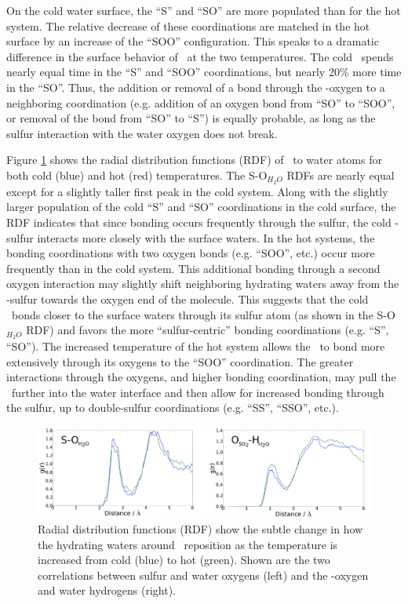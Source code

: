 \documentclass{article}
\begin{document}
On the cold water surface, the ``S'' and ``SO'' are more populated than for the hot system. The relative decrease of these coordinations are matched in the hot surface by an increase of the ``SOO'' configuration. This speaks to a dramatic difference in the surface behavior of \suldiox~at the two temperatures. The cold \suldiox~spends nearly equal time in the ``S'' and ``SOO'' coordinations, but nearly 20\% more time in the ``SO''. Thus, the addition or removal of a bond through the \suldiox-oxygen to a neighboring coordination (e.g. addition of an oxygen bond from ``SO'' to ``SOO'', or removal of the bond from ``SO'' to ``S'') is equally probable, as long as the sulfur interaction with the water oxygen does not break. 

Figure \ref{fig:rdf} shows the radial distribution functions (RDF) of \suldiox~to water atoms for both cold (blue) and hot (red) temperatures. The S-O$_{H_2O}$ RDFs are nearly equal except for a slightly taller first peak in the cold system. Along with the slightly larger population of the cold ``S'' and ``SO'' coordinations in the cold surface, the RDF indicates that since bonding occurs frequently through the sulfur, the cold \suldiox-sulfur interacts more closely with the surface waters. In the hot systems, the bonding coordinations with two oxygen bonds (e.g. ``SOO'', etc.) occur more frequently than in the cold system. This additional bonding through a second oxygen interaction may slightly shift neighboring hydrating waters away from the \suldiox-sulfur towards the oxygen end of the molecule. This suggests that the cold \suldiox~bonds closer to the surface waters through its sulfur atom (as shown in the S-O$_{H_2O}$ RDF) and favors the more ``sulfur-centric'' bonding coordinations (e.g. ``S'', ``SO''). The increased temperature of the hot system allows the \suldiox~to bond more extensively through its oxygens to the ``SOO'' coordination. The greater interactions through the oxygens, and higher bonding coordination, may pull the \suldiox~further into the water interface and then allow for increased bonding through the sulfur, up to double-sulfur coordinations (e.g. ``SS'', ``SSO'', etc.).

\begin{figure}[h!]
	\begin{center}
		\includegraphics[scale=1.0]{rdf-small.png}
		\caption{Radial distribution functions (RDF) show the subtle change in how the hydrating waters around \suldiox~reposition as the temperature is increased from cold (blue) to hot (green). Shown are the two correlations between sulfur and water oxygens (left) and the \suldiox-oxygen and water hydrogens (right).}
		\label{fig:rdf}
	\end{center}
\end{figure}
\end{document}
